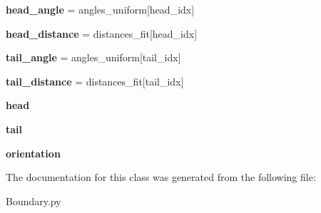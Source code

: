 \begin{DoxyCompactItemize}
\item 
\mbox{\label{class_boundary_1_1_boundary_a82f6d6bacdb0e82cd166f032df04af22}} 
{\bfseries head\+\_\+angle} = angles\+\_\+uniform\mbox{[}head\+\_\+idx\mbox{]}
\item 
\mbox{\label{class_boundary_1_1_boundary_ae284608d086ef897626f30620e94d09d}} 
{\bfseries head\+\_\+distance} = distances\+\_\+fit\mbox{[}head\+\_\+idx\mbox{]}
\item 
\mbox{\label{class_boundary_1_1_boundary_abd0d91ed3377254b2495793d8697011a}} 
{\bfseries tail\+\_\+angle} = angles\+\_\+uniform\mbox{[}tail\+\_\+idx\mbox{]}
\item 
\mbox{\label{class_boundary_1_1_boundary_af06b6c381ada3e4792544cf7b9dae9e1}} 
{\bfseries tail\+\_\+distance} = distances\+\_\+fit\mbox{[}tail\+\_\+idx\mbox{]}
\item 
\mbox{\label{class_boundary_1_1_boundary_a9cb52895ea99f4fbfc7cbfdff831ec17}} 
{\bfseries head}
\item 
\mbox{\label{class_boundary_1_1_boundary_aa636c2703c79fa7934b4cfb7762192ac}} 
{\bfseries tail}
\item 
\mbox{\label{class_boundary_1_1_boundary_ab1595489d5382ab63db932d24614509b}} 
{\bfseries orientation}
\end{DoxyCompactItemize}


The documentation for this class was generated from the following file\+:\begin{DoxyCompactItemize}
\item 
Boundary.\+py\end{DoxyCompactItemize}
